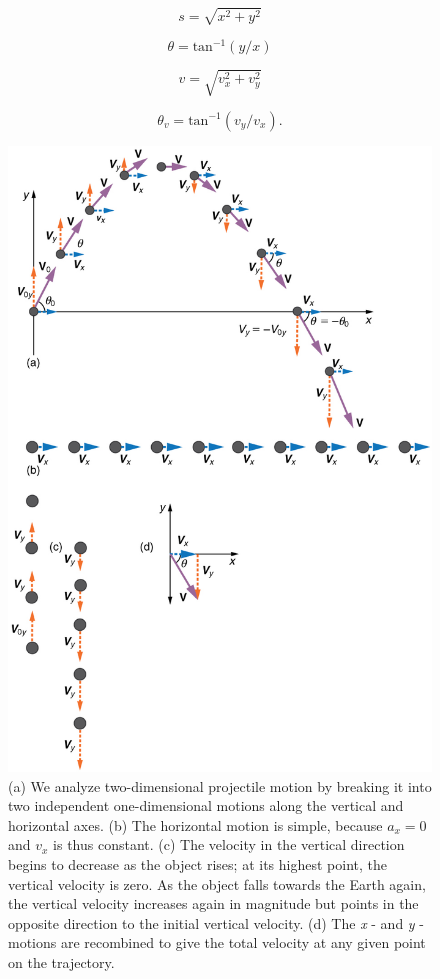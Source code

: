 \documentclass[
]{book}
\begin{document}
\leavevmode{}%
\[{s = \sqrt{x^{2} + y^{2}}}{}\]

\leavevmode{}%
\[{{\theta = \text{tan}^{- 1}}({y/x})}{}\]

\leavevmode{}%
\[{v = \sqrt{v_{x}^{2} + v_{y}^{2}}}{}\]

\leavevmode{}%
\[{{\theta_{v} = \text{tan}^{- 1}}({v_{y}/v_{x}})\text{.}}{}\]

\begin{figure}
\hypertarget{import-auto-id1815222}{%
\centering
\includegraphics{images/Figure_03_04_02.jpg}
\caption{(a) We analyze two-dimensional projectile motion by breaking it into
two independent one-dimensional motions along the vertical and
horizontal axes. (b) The horizontal motion is simple, because
\({a_{x} = 0}{}\) and \(v_{x}{}\) is thus constant. (c) The velocity in the
vertical direction begins to decrease as the object rises; at its
highest point, the vertical velocity is zero. As the object falls
towards the Earth again, the vertical velocity increases again in
magnitude but points in the opposite direction to the initial vertical
velocity. (d) The \emph{x} - and \emph{y} -motions are recombined to give the
total velocity at any given point on the
trajectory.}\label{import-auto-id1815222}
}
\end{figure}
\end{document}
